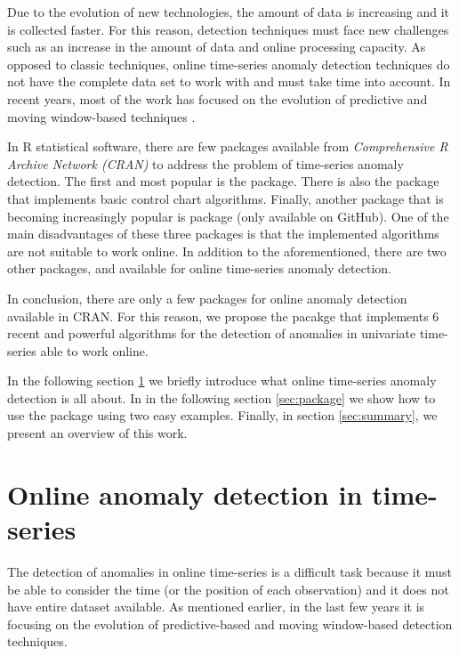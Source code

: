 \documentclass[a4paper]{article}\usepackage[]{graphicx}\usepackage[]{color}
\begin{document}
Due to the evolution of new technologies, the amount of data is increasing and it is collected faster. For this reason, detection techniques must face new challenges such as an increase in the amount of data and online processing capacity. As opposed to classic techniques, online time-series anomaly detection techniques do not have the complete data set to work with and must take time into account. In recent years, most of the work has focused on the evolution of predictive and moving window-based techniques  \cite{a3e0f1cf080343d98cae7430cd6e43c4}.

In R statistical software, there are few packages available from \emph{Comprehensive R Archive Network (CRAN)} to address the problem of time-series anomaly detection. The first and most popular is the  package. There is also the  package that implements basic control chart algorithms. Finally, another package that is becoming increasingly popular is  package (only available on GitHub). One of the main disadvantages of these three packages is that the implemented algorithms are not suitable to work online. In addition to the aforementioned, there are two other packages,  and  available for online time-series anomaly detection.

In conclusion, there are only a few packages for online anomaly detection available in CRAN. For this reason, we propose the  pacakge that implements 6 recent and powerful algorithms for the detection of anomalies in univariate time-series able to work online.

In the following section \ref{sec:online} we briefly introduce what online time-series anomaly detection is all about. In in the following section \ref{sec:package} we show how to use the  package using two easy examples. Finally, in section \ref{sec:summary}, we present an overview of this work.

\section{Online anomaly detection in time-series}\label{sec:online}

The detection of anomalies in online time-series is a difficult task because it must be able to consider the time (or the position of each observation) and it does not have entire dataset available. As mentioned earlier, in the last few years it is focusing on the evolution of predictive-based and moving window-based detection techniques.
\end{document}
